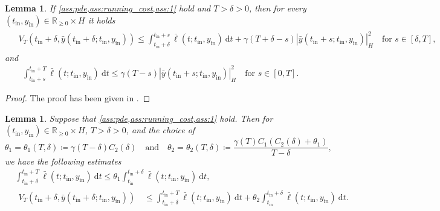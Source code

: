 \documentclass{m2an}
\newcommand{\dt}{\mathrm{d}t}
\newcommand{\tint}{t_{\mathrm{in}}}
\newcommand{\yint}{y_{\mathrm{in}}}
\newcommand{\norm}[2]{\left|#1\right|_{#2}}
\newtheorem{lemma}[thrm]{Lemma}
\begin{document}
\begin{lemma}\label{lem2}
    If \cref{ass:pde,ass:running_cost,ass:1} hold and $T>\delta>0$, then for every  $(\tint,\yint) \in  \mathbb{R}_{\geq 0} \times H$ {it holds
    \begin{align}
        \label{lem2c1}
        &\begin{aligned}
            V_T(\tint+\delta, \bar y(\tint+\delta;\tint, \yint))\leq\int^{\tint+s}_{\tint+\delta} \bar \ell(t;\tint, \yint)\ \dt+\gamma(T+\delta-s)\norm{\bar y(\tint+ s;\tint, \yint)}{H}^2 \quad \text{for } s \in [\delta, T],
        \end{aligned}
        \end{align}
        and
        \begin{align}
        \label{lem2c2}
        &\int^{\tint+T}_{\tint+s} \bar\ell(t;\tint, \yint)\ \dt \leq\gamma(T-s)\norm{\bar y(\tint+s;\tint, \yint)}{H}^2 \quad \text{for }s \in [0, T].
    \end{align}}
\end{lemma}
%
\begin{proof}
The proof has been given in \cite[Lemma 2.3]{azmi2019hybrid}. 
\end{proof}
%
\begin{lemma}\label{lem3}
%
    Suppose that \cref{ass:pde,ass:running_cost,ass:1} hold. Then for $ (\tint,\yint) \in  \mathbb{R}_{\geq 0} \times H$, $T>\delta>0$,
    and the choice of
    \begin{equation*}
    \theta_1=\theta_1(T,\delta) \coloneqq \gamma(T-\delta)C_2(\delta) \quad \text{and}\quad \theta_2=\theta_2(T,\delta) \coloneqq
    \frac{\gamma(T)C_1(C_2(\delta)+\theta_1)}{T-\delta},
    \end{equation*}
    we have the following estimates
    \begin{align}
        \label{e23}
        &\int^{ \tint+T}_{\tint+\delta} \bar \ell(t; \tint, \yint)\ \dt \leq \theta_1 \int^{\tint+\delta}_{\tint} \bar \ell(t; \tint, \yint)\ \dt,\\
        \label{e24}
        &\begin{aligned}
            V_T(\tint+\delta,\bar y(\tint+\delta;\tint, \yint))\quad\leq \int^{\tint+T}_{\tint+\delta} \bar\ell(t;\tint, \yint)\ \dt + \theta_2\int_{\tint}^{\tint+\delta} \bar\ell(t;\tint, \yint)\ \dt.
        \end{aligned}
    \end{align}
\end{lemma}
%
\end{document}
